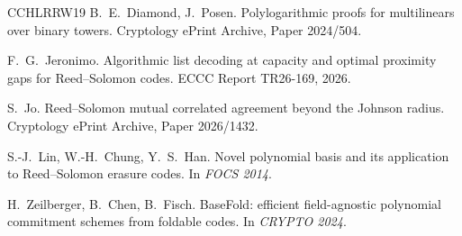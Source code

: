 \begin{thebibliography}{CCHLRRW19}
B.~E.~Diamond, J.~Posen.
\newblock Polylogarithmic proofs for multilinears over binary towers.
\newblock Cryptology ePrint Archive, Paper 2024/504.

F.~G.~Jeronimo.
\newblock Algorithmic list decoding at capacity and optimal proximity gaps for Reed--Solomon codes.
\newblock ECCC Report TR26-169, 2026.

S.~Jo.
\newblock Reed--Solomon mutual correlated agreement beyond the Johnson radius.
\newblock Cryptology ePrint Archive, Paper 2026/1432.

S.-J.~Lin, W.-H.~Chung, Y.~S.~Han.
\newblock Novel polynomial basis and its application to Reed--Solomon erasure codes.
\newblock In \emph{FOCS 2014}.

H.~Zeilberger, B.~Chen, B.~Fisch.
\newblock BaseFold: efficient field-agnostic polynomial commitment schemes from foldable codes.
\newblock In \emph{CRYPTO 2024}.

\end{thebibliography}
